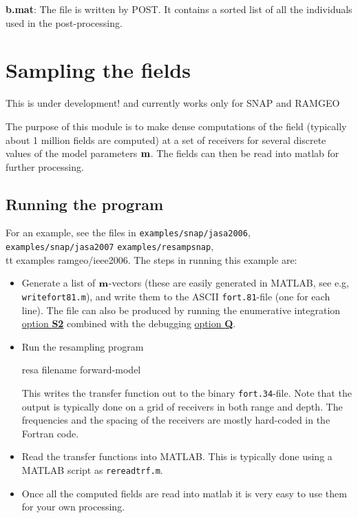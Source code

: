 \documentclass{saclantc}
\begin{document}
{\bf *b.mat}: The file is written by {\sf POST}. 
It contains a sorted list of  all the individuals used in
the post-processing. 


\section{Sampling the fields}
\label{se:resa}

This is under development! and currently works only for {\sf SNAP} and
{\sf RAMGEO}

The purpose of this module is to make dense computations of the field
(typically about 1 million fields are computed) at a set of receivers for several discrete values of the model
parameters $\bf m$. The fields can then be read into matlab for further
processing.  

\subsection{Running the program}
For an example,  see the files in {\tt examples/snap/jasa2006}, {\tt examples/snap/jasa2007} {\tt examples/resampsnap}, {\\tt examples ramgeo/ieee2006}.
The steps in running this example are:
\begin{itemize}
\item Generate a list of $\bf m$-vectors (these are easily generated in
  MATLAB, see e.g, {\tt writefort81.m}), and write them to the ASCII {\tt fort.81}-file (one for each
  line).
The file can also be produced by running the enumerative integration  
\underline{option {\bf S2}}  combined with  the debugging
  \underline{option {\bf Q}}. 
\item Run the resampling program 
 
\begin{tt}
resa filename forward-model
\end{tt}

This writes the transfer function out to the binary {\tt fort.34}-file.
Note that the output is typically done on a grid of receivers in both
range and depth. The frequencies and the spacing of the receivers are
mostly hard-coded in the Fortran code. 
\item Read the transfer functions into {\sc MATLAB}. This is typically done
  using a {\sc MATLAB} script as {\tt rereadtrf.m}.
\item Once all the computed fields are read into matlab it is very easy
  to use them for your own processing.
\end{itemize}
\end{document}
